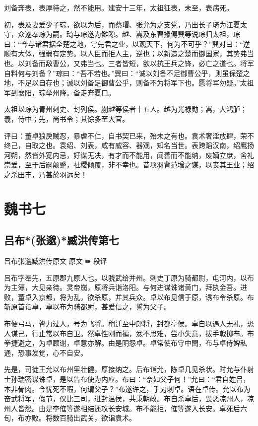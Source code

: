 \documentclass[12pt,UTF8]{ctexbook}
\begin{document}
刘备奔表，表厚待之，然不能用。建安十三年，太祖征表，未至，表病死。

初，表及妻爱少子琮，欲以为后，而蔡瑁、张允为之支党，乃出长子琦为江夏太守，众遂奉琮为嗣。琦与琮遂为雠隙。越、嵩及东曹掾傅巽等说琮归太祖，琮曰：“今与诸君据全楚之地，守先君之业，以观天下，何为不可乎？”巽对曰：“逆顺有大体，强弱有定势。以人臣而拒人主，逆也；以新造之楚而御国家，其势弗当也。以刘备而敌曹公，又弗当也。三者皆短，欲以抗王兵之锋，必亡之道也。将军自料何与刘备？”琮曰：“吾不若也。”巽曰：“诚以刘备不足御曹公乎，则虽保楚之地，不足以自存也；诚以刘备足御曹公乎，则备不为将军下也。愿将军勿疑。”太祖军到襄阳，琮举州降。备走奔夏口。

太祖以琮为青州刺史、封列侯。蒯越等侯者十五人。越为光禄勋；嵩，大鸿胪；羲，侍中；先，尚书令；其馀多至大官。

评曰：董卓狼戾贼忍，暴虐不仁，自书契已来，殆未之有也。袁术奢淫放肆，荣不终己，自取之也。袁绍、刘表，咸有威容、器观，知名当世。表跨蹈汉南，绍鹰扬河朔，然皆外宽内忌，好谋无决，有才而不能用，闻善而不能纳，废嫡立庶，舍礼崇爱，至于后嗣颠蹙，社稷倾覆，非不幸也。昔项羽背范增之谋，以丧其王业；绍之杀田丰，乃甚於羽远矣！

\part{魏书七}
\chapter{吕布*(张邈)*臧洪传第七}

吕布张邈臧洪传原文
原文 ⇛ 段译

吕布字奉先，五原郡九原人也。以骁武给并州。刺史丁原为骑都尉，屯河内，以布为主簿，大见亲待。灵帝崩，原将兵诣洛阳。与何进谋诛诸黄门，拜执金吾。进败，董卓入京都，将为乱，欲杀原，并其兵众。卓以布见信于原，诱布令杀原。布斩原首诣卓，卓以布为骑都尉，甚爱信之，誓为父子。

布便弓马，膂力过人，号为飞将。稍迁至中郎将，封都亭侯。卓自以遇人无礼，恐人谋己，行止常以布自卫。然卓性刚而褊，忿不思难，尝小失意，拔手戟掷布。布拳捷避之，为卓顾谢，卓意亦解。由是阴怨卓。卓常使布守中閤，布与卓侍婢私通，恐事发觉，心不自安。

先是，司徒王允以布州里壮健，厚接纳之。后布诣允，陈卓几见杀状。时允与仆射士孙瑞密谋诛卓，是以告布使为内应。布曰：“奈如父子何！”允曰：“君自姓吕，本非骨肉。今忧死不暇，何谓父子？”布遂许之，手刃刺卓。语在卓传。允以布为奋武将军，假节，仪比三司，进封温侯，共秉朝政。布自杀卓后，畏恶凉州人，凉州人皆怨。由是李傕等遂相结还攻长安城。布不能拒，傕等遂入长安。卓死后六旬，布亦败。将数百骑出武关，欲诣袁术。
\end{document}
